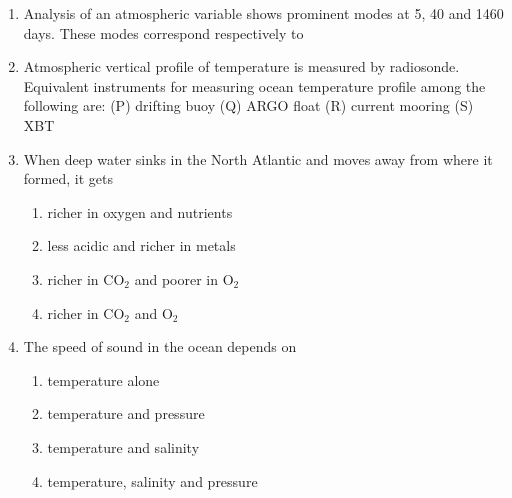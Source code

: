 \documentclass[a4paper,10pt]{article}
\begin{document}
\begin{enumerate}
    \item Analysis of an atmospheric variable shows prominent modes at 5, 40 and 1460 days. These modes correspond respectively to
    \hfill{}
    \begin{enumerate}[label=\Alph*)]
    \end{enumerate}

    \item Atmospheric vertical profile of temperature is measured by radiosonde. Equivalent instruments for measuring ocean temperature profile among the following are:
    (P) drifting buoy (Q) ARGO float (R) current mooring (S) XBT
    \hfill{}
    \begin{enumerate}[label=\Alph*)]
    \end{enumerate}

    \item When deep water sinks in the North Atlantic and moves away from where it formed, it gets
    \hfill{}
    \begin{enumerate}[label=\Alph*)]
        \item richer in oxygen and nutrients
        \item less acidic and richer in metals
        \item richer in CO$_2$ and poorer in O$_2$
        \item richer in CO$_2$ and O$_2$
    \end{enumerate}

    \item The speed of sound in the ocean depends on
    \hfill{}
    \begin{enumerate}[label=\Alph*)]
        \item temperature alone
        \item temperature and pressure
        \item temperature and salinity
        \item temperature, salinity and pressure
    \end{enumerate}


\end{enumerate}
\end{document}
